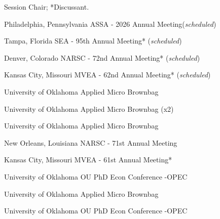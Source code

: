 \textdagger Session Chair; *Discussant.


{%
	Philadelphia, Pennsylvania}
{%
	ASSA - 2026 Annual Meeting\ec (\textit{scheduled})}
{}


{%
	Tampa, Florida}
{%
	SEA - 95th Annual Meeting* (\textit{scheduled})}
{}


{%
	Denver, Colorado}
{%
	NARSC - 72nd Annual Meeting* (\textit{scheduled})}
{}

{%
	Kansas City, Missouri}
{%
	MVEA - 62nd Annual Meeting* (\textit{scheduled})}
{}

{%
	University of Oklahoma}
{%
	Applied Micro Brownbag }
{}

{%
	University of Oklahoma}
{%
	Applied Micro Brownbag (x2)}
{}

{%
	University of Oklahoma}
{%
	Applied Micro Brownbag}
{}

{%
	New Orleans, Louisiana}
{%
	NARSC - 71st Annual Meeting\ec}
{}

{%
	Kansas City, Missouri}
{%
	MVEA - 61st Annual Meeting*}
{}


{%
	University of Oklahoma}
{%
	OU PhD Econ Conference -OPEC}
{}

{%
	University of Oklahoma}
{%
	Applied Micro Brownbag}
{}

{%
	University of Oklahoma}
{%
	OU PhD Econ Conference -OPEC}
{}